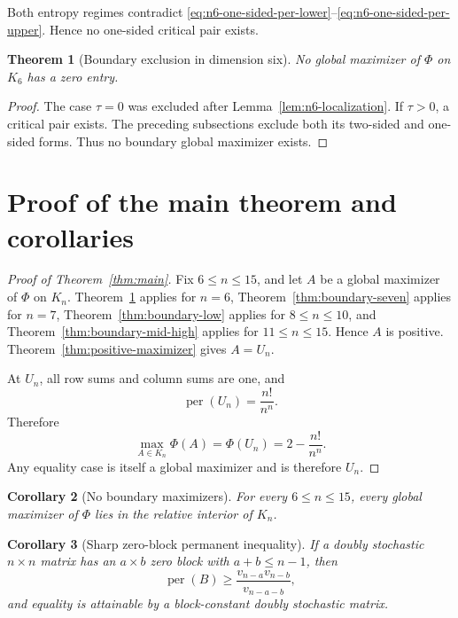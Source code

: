 \documentclass[11pt]{article}
\newtheorem{theorem}{Theorem}[section]
\newtheorem{corollary}[theorem]{Corollary}
\theoremstyle{definition}
\newcommand{\per}{\operatorname{per}}
\newcommand{\1}{\mathbf{1}}
\begin{document}
Both entropy regimes contradict
\eqref{eq:n6-one-sided-per-lower}--\eqref{eq:n6-one-sided-per-upper}.
Hence no one-sided critical pair exists.

\begin{theorem}[Boundary exclusion in dimension six]
\label{thm:boundary-six}
No global maximizer of $\Phi$ on $K_6$ has a zero entry.
\end{theorem}

\begin{proof}
The case $\tau=0$ was excluded after Lemma~\ref{lem:n6-localization}.  If
$\tau>0$, a critical pair exists.  The preceding subsections exclude both
its two-sided and one-sided forms.  Thus no boundary global maximizer exists.
\end{proof}

\renewcommand{\theequation}{\arabic{equation}}
\renewcommand{\theHequation}{\arabic{equation}}


\section{Proof of the main theorem and corollaries}\label{sec:completion}

\begin{proof}[Proof of Theorem~\ref{thm:main}]
Fix $6\le n\le15$, and let $A$ be a global maximizer of $\Phi$ on $K_n$.  Theorem~\ref{thm:boundary-six} applies for $n=6$, Theorem~\ref{thm:boundary-seven} applies for $n=7$, Theorem~\ref{thm:boundary-low} applies for $8\le n\le10$, and Theorem~\ref{thm:boundary-mid-high} applies for $11\le n\le15$.  Hence $A$ is positive.  Theorem~\ref{thm:positive-maximizer} gives $A=U_n$.

At $U_n$, all row sums and column sums are one, and
\[
 \per(U_n)=\frac{n!}{n^n}.
\]
Therefore
\[
 \max_{A\in K_n}\Phi(A)
 =\Phi(U_n)
 =2-\frac{n!}{n^n}.
\]
Any equality case is itself a global maximizer and is therefore $U_n$.
\end{proof}

\begin{corollary}[No boundary maximizers]\label{cor:no-boundary}
For every $6\le n\le15$, every global maximizer of $\Phi$ lies in the relative interior of $K_n$.
\end{corollary}

\begin{corollary}[Sharp zero-block permanent inequality]\label{cor:sharp-block-restated}
If a doubly stochastic $n\times n$ matrix has an $a\times b$ zero block with $a+b\le n-1$, then
\[
 \per(B)\ge\frac{v_{n-a}v_{n-b}}{v_{n-a-b}},
\]
and equality is attainable by a block-constant doubly stochastic matrix.
\end{corollary}
\end{document}
